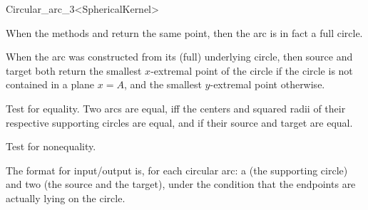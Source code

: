 \begin{ccRefClass}{Circular_arc_3<SphericalKernel>}
\ccGlue
{}

When the methods  and  return the same point, then 
the arc is in fact a full circle. %

When the arc was constructed from its (full) underlying circle, then
source and target both return the smallest $x$-extremal point of the
circle if the circle is not contained in a plane $x=A$, and the smallest
$y$-extremal point otherwise.

\ccOperations

{Test for equality. Two arcs are equal, iff the centers and squared
  radii of their respective supporting circles are equal, and if their
  source and target are equal.} 

{Test for nonequality.} 


\ccGlue
{}

The format for input/output is, for each circular arc: a  
(the supporting circle) and two  
(the source and the target), under the condition that the endpoints 
are actually lying on the circle. 

\ccSeeAlso

\\

\end{ccRefClass}
